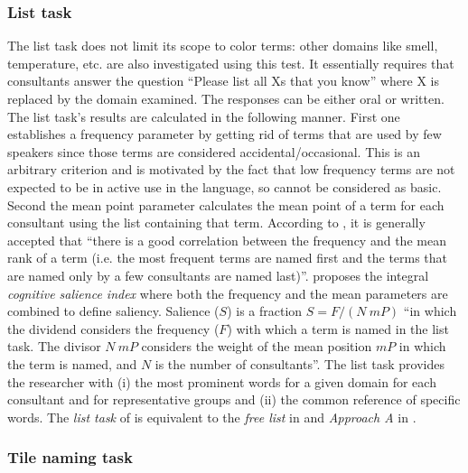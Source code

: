 \subsubsection{List task}
\label{sec:listtask}

The list task does not limit its scope to color terms: other domains like smell,
temperature, etc. are also investigated using this test. It essentially requires
that consultants  answer the question ``Please list all Xs that you know'' 
where
X is replaced by the domain examined. The responses can be either oral or
written. The list task's results are calculated in the following manner. First
one establishes a  frequency parameter by  getting rid of terms that are
used by few speakers since those terms are considered  accidental/occasional.
This is an arbitrary criterion and is motivated by the fact that low frequency
terms are not expected to be in active use in the language, so cannot be
considered as basic. Second the mean point parameter calculates the mean
point of a term for each consultant using the  list containing that term.
According
to \citet[265]{Sutr01}, it is generally accepted that ``there is a good
correlation between the frequency and the mean rank of a term (i.e. the most
frequent terms are named first and the terms that are named only by a few
consultants
are named last)''. \citeauthor{Sutr01} proposes the integral {\it cognitive
salience index} where both the frequency and the mean parameters are combined to
define saliency. Salience ($S$) is a fraction $S=F/(N \ mP)$ ``in which the
dividend considers the frequency ($F$) with which a term is named
in the list task. The divisor $N \ mP$ considers the weight of the mean position
$mP$ in which the term is named, and $N$ is the number of consultants''. The
list
task provides the researcher with (i) the most prominent words for a given
domain for each consultant and for representative groups and (ii) the common
reference of specific words. The \textit{list task} of \cite{Davi94,
Sutr98, Sutr01} is equivalent to the \textit{free list} in \cite{Smit93} and 
\textit{Approach A} in \citet[340]{Lenn67}.


\subsubsection{Tile naming task}
\label{sec:chiptask}

